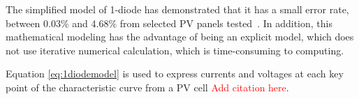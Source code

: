 \documentclass[journal]{IEEEtran}
\begin{document}
The simplified model of 1-diode has demonstrated that it has a small error rate, between 0.03\% and 4.68\% from selected PV panels tested~\cite{Saloux}. In addition, this mathematical modeling has the advantage of being an explicit model, which does not use iterative numerical calculation, which is time-consuming to computing. 
 
%
Equation \eqref{eq:1diodemodel} is used to express currents and voltages at each key point of the characteristic curve from a PV cell \textcolor{red}{Add citation here}.
%
\end{document}
